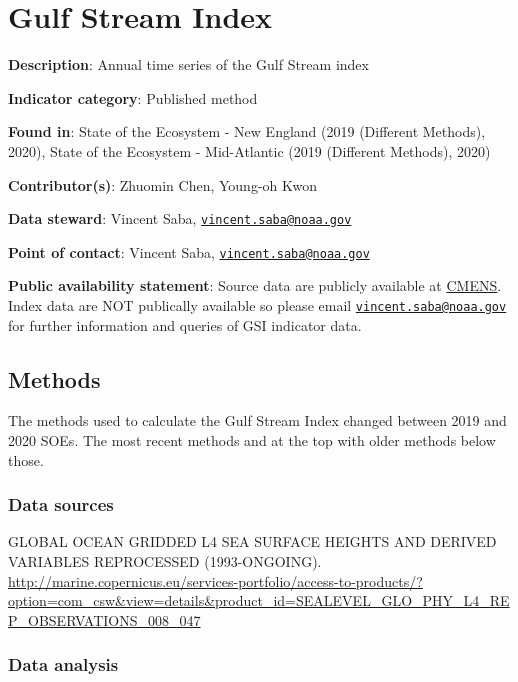 \documentclass[
]{book}
\begin{document}
\hypertarget{gulf-stream-index}{%
\chapter{Gulf Stream Index}\label{gulf-stream-index}}

\textbf{Description}: Annual time series of the Gulf Stream index

\textbf{Indicator category}: Published method

\textbf{Found in}: State of the Ecosystem - New England (2019 (Different Methods), 2020),
State of the Ecosystem - Mid-Atlantic (2019 (Different Methods), 2020)

\textbf{Contributor(s)}: Zhuomin Chen, Young-oh Kwon

\textbf{Data steward}: Vincent Saba, \href{mailto:vincent.saba@noaa.gov}{\nolinkurl{vincent.saba@noaa.gov}}

\textbf{Point of contact}: Vincent Saba, \href{mailto:vincent.saba@noaa.gov}{\nolinkurl{vincent.saba@noaa.gov}}

\textbf{Public availability statement}: Source data are publicly available at \href{http://marine.copernicus.eu/services-portfolio/access-to-products/?option=com_csw\&view=details\&product_id=SEALEVEL_GLO_PHY_L4_REP_OBSERVATIONS_008_047}{CMENS}. Index data are NOT publically available so please email \href{mailto:vincent.saba@noaa.gov}{\nolinkurl{vincent.saba@noaa.gov}} for further information and queries of GSI indicator data.

\hypertarget{methods-16}{%
\section{Methods}\label{methods-16}}

The methods used to calculate the Gulf Stream Index changed between 2019 and 2020 SOEs. The most recent methods and at the top with older methods below those.

\hypertarget{data-sources-16}{%
\subsection{Data sources}\label{data-sources-16}}

GLOBAL OCEAN GRIDDED L4 SEA SURFACE HEIGHTS AND DERIVED VARIABLES REPROCESSED (1993-ONGOING). \url{http://marine.copernicus.eu/services-portfolio/access-to-products/?option=com_csw\&view=details\&product_id=SEALEVEL_GLO_PHY_L4_REP_OBSERVATIONS_008_047}

\hypertarget{data-analysis-15}{%
\subsection{Data analysis}\label{data-analysis-15}}
\end{document}
